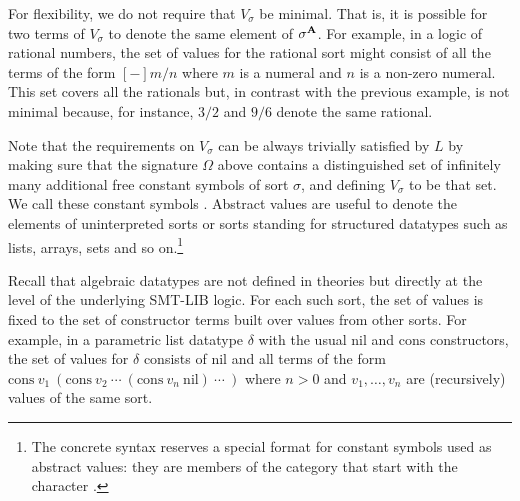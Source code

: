 For flexibility, we do not require that $V_\sigma$ be minimal.
That is, it is possible for two terms of $V_\sigma$ to denote 
the same element of $\sigma^{\mathbf{A}}$.
For example,
in a logic of rational numbers, the set of values for the rational sort
might consist of all the terms of the form $[-]m/n$
where $m$ is a numeral and $n$ is a non-zero numeral.
This set covers all the rationals 
but, in contrast with the previous example, is not minimal
because, for instance, $3/2$ and $9/6$ denote the same rational.

Note that the requirements on $V_\sigma$ can be always trivially satisfied 
by $L$ by making sure that the signature
$\Omega$ above contains 
a distinguished set of infinitely many additional free constant symbols of 
sort $\sigma$,
and defining $V_\sigma$ to be that set.
We call these constant symbols .
Abstract values are useful to denote the elements of uninterpreted  
sorts or sorts standing for structured datatypes
such as lists, arrays, sets and so on.\footnote{%
The concrete syntax reserves a special format for constant symbols 
used as abstract values: 
they are members of the  category 
that start with the character .
}

Recall that algebraic datatypes are not defined in theories but directly 
at the level of the underlying SMT-LIB logic. 
For each such sort, the set of values is fixed to the set 
of constructor terms built over values from other sorts.
For example, in a parametric list datatype $\delta$ 
with the usual $\mathrm{nil}$ and $\mathrm{cons}$ constructors,
the set of values for $\delta$ consists of $\mathrm{nil}$ and 
all terms of the form 
$\mathrm{cons}\ v_1\ (\mathrm{cons}\ v_2\ \cdots\ (\mathrm{cons}\ v_n\ \mathrm{nil})\ \cdots\ )$
where $n > 0$ and 
$v_1, \ldots, v_n$ are (recursively) values of the same sort.






